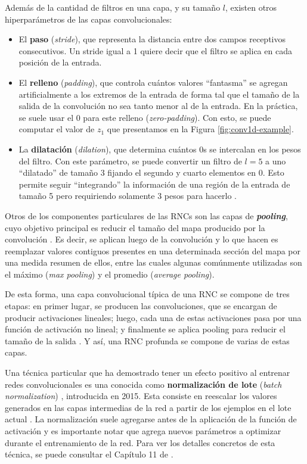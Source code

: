 \documentclass[../../main.tex]{subfiles}
\begin{document}
Además de la cantidad de filtros en una capa, y su tamaño \(l\), existen otros
hiperparámetros de las capas convolucionales: \vspace{-0.25cm}
\begin{itemize}[noitemsep]
    \item El \textbf{paso} (\textit{stride}), que representa la distancia entre dos campos receptivos
    consecutivos. Un stride igual a 1 quiere decir que el filtro se aplica en cada
    posición de la entrada.
    \item El \textbf{relleno} (\textit{padding}), que controla cuántos valores
    ``fantasma'' se agregan artificialmente a los extremos de la entrada de forma tal que
    el tamaño de la salida de la convolución no sea tanto menor al de la entrada. En la
    práctica, se suele usar el 0 para este relleno (\textit{zero-padding}). Con esto, se
    puede computar el valor de \(z_1\) que presentamos en la Figura
    \ref{fig:conv1d-example}.
    \item La \textbf{dilatación} (\textit{dilation}), que determina cuántos 0s se
    intercalan en los pesos del filtro. Con este parámetro, se puede convertir un filtro
    de \(l=5\) a uno ``dilatado'' de tamaño 3 fijando el segundo y cuarto elementos en 0.
    Esto permite seguir ``integrando'' la información de una región de la entrada de
    tamaño 5 pero requiriendo solamente 3 pesos para hacerlo
    \cite{prince2024understanding}.
\end{itemize}

Otros de los componentes particulares de las RNCs son las capas de
\textbf{\textit{pooling}}, cuyo objetivo principal es reducir el tamaño del mapa producido
por la convolución \cite{hands-on-ML-sklearn-tf}. Es decir, se aplican luego de la
convolución y lo que hacen es reemplazar valores contiguos presentes en una determinada
sección del mapa por una medida resumen de ellos, entre las cuales algunas comúnmente
utilizadas son el máximo (\textit{max pooling}) y el promedio (\textit{average pooling}).

De esta forma, una capa convolucional típica de una RNC se compone de tres etapas: en
primer lugar, se producen las convoluciones, que se encargan de producir activaciones
lineales; luego, cada una de estas activaciones pasa por una función de activación no
lineal; y finalmente se aplica pooling para reducir el tamaño de la salida
\cite{deep-learning}. Y así, una RNC profunda se compone de varias de estas capas.

\medskip
Una técnica particular que ha demostrado tener un efecto positivo al entrenar redes
convolucionales es una conocida como \textbf{normalización de lote} (\textit{batch
normalization}) \cite{batch-norm} \cite{deep-learning} \cite{hands-on-ML-sklearn-tf},
introducida en 2015. Esta consiste en reescalar los valores generados en las capas
intermedias de la red a partir de los ejemplos en el lote actual
\cite{ai-a-modern-approach}. La normalización suele agregarse antes de la aplicación de la
función de activación y es importante notar que agrega nuevos parámetros a optimizar
durante el entrenamiento de la red. Para ver los detalles concretos de esta técnica, se
puede consultar el Capítulo 11 de \cite{hands-on-ML-sklearn-tf}.
\end{document}
